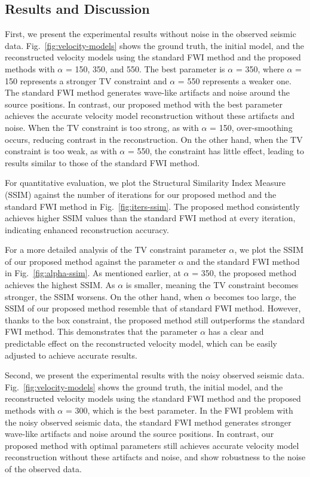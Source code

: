 \subsection{Results and Discussion} \label{subsec:results-and-discussion}
First, we present the experimental results without noise in the observed seismic data.
Fig.~\ref{fig:velocity-models} shows the ground truth, the initial model, and the reconstructed velocity models using the standard FWI method and the proposed methods with $\alpha$ = 150, 350, and 550.
The best parameter is $\alpha$ = 350, where $\alpha$ = 150 represents a stronger TV constraint and $\alpha$ = 550 represents a weaker one.
The standard FWI method generates wave-like artifacts and noise around the source positions.
In contrast, our proposed method with the best parameter achieves the accurate velocity model reconstruction without these artifacts and noise.
When the TV constraint is too strong, as with $\alpha$ = 150, over-smoothing occurs, reducing contrast in the reconstruction.
On the other hand, when the TV constraint is too weak, as with $\alpha$ = 550, the constraint has little effect, leading to results similar to those of the standard FWI method.

For quantitative evaluation, we plot the Structural Similarity Index Measure (SSIM) against the number of iterations for our proposed method and the standard FWI method in Fig.~\ref{fig:iters-ssim}.
The proposed method consistently achieves higher SSIM values than the standard FWI method at every iteration, indicating enhanced reconstruction accuracy.

For a more detailed analysis of the TV constraint parameter $\alpha$, we plot the SSIM of our proposed method against the parameter $\alpha$ and the standard FWI method in Fig.~\ref{fig:alpha-ssim}.
As mentioned earlier, at $\alpha$ = 350, the proposed method achieves the highest SSIM.
As $\alpha$ is smaller, meaning the TV constraint becomes stronger, the SSIM worsens.
On the other hand, when $\alpha$ becomes too large, the SSIM of our proposed method resemble that of standard FWI method.
However, thanks to the box constraint, the proposed method still outperforms the standard FWI method.
This demonstrates that the parameter $\alpha$ has a clear and predictable effect on the reconstructed velocity model, which can be easily adjusted to achieve accurate results.


Second, we present the experimental results with the noisy observed seismic data.
Fig.~\ref{fig:velocity-models} shows the ground truth, the initial model, and the reconstructed velocity models using the standard FWI method and the proposed methods with $\alpha$ = 300, which is the best parameter.
In the FWI problem with the noisy observed seismic data, the standard FWI method generates stronger wave-like artifacts and noise around the source positions.
In contrast, our proposed method with optimal parameters still achieves accurate velocity model reconstruction without these artifacts and noise, and show robustness to the noise of the observed data.

